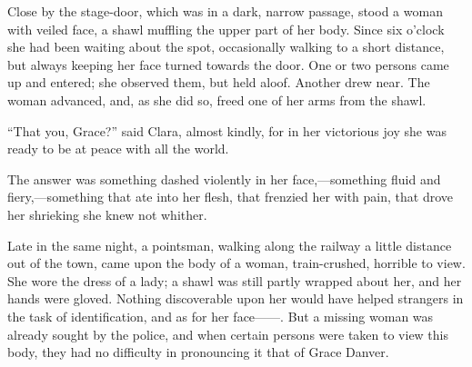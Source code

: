Close by the stage-door, which was in a dark, narrow passage, stood a
woman with veiled face, a shawl muffling the upper part of her body.
Since six o'clock she had been waiting about the spot, occasionally
walking to a short distance, but always keeping her face turned towards
the door. One or two persons came up and entered; she observed them, but
held aloof. Another drew near. The woman advanced, and, as she did so,
freed one of her arms from the shawl.

{\protect\hypertarget{215}{}{}}``That you, Grace?'' said Clara, almost
kindly, for in her victorious joy she was ready to be at peace with all
the world.

The answer was something dashed violently in her face,---something fluid
and fiery,---something that ate into her flesh, that frenzied her with
pain, that drove her shrieking she knew not whither.

Late in the same night, a pointsman, walking along the railway a little
distance out of the town, came upon the body of a woman, train-crushed,
horrible to view. She wore the dress of a lady; a shawl was still partly
wrapped about her, and her hands were gloved. Nothing discoverable upon
her would have helped strangers in the task of identification, and as
for her {face{{------}}.} But a missing woman was already sought by the
police, and when certain persons were taken to view this body, they had
no difficulty in pronouncing it that of Grace Danver.
